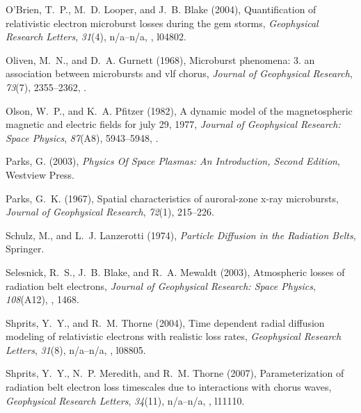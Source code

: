 \documentclass[draft,linenumbers]{agujournal}
\begin{document}
\begin{thebibliography}{35}
O'Brien, T.~P., M.~D. Looper, and J.~B. Blake (2004), Quantification of
  relativistic electron microburst losses during the gem storms,
  \textit{Geophysical Research Letters}, \textit{31}(4), n/a--n/a,
  , l04802.

Oliven, M.~N., and D.~A. Gurnett (1968), Microburst phenomena: 3. an
  association between microbursts and vlf chorus, \textit{Journal of
  Geophysical Research}, \textit{73}(7), 2355--2362,
  .

Olson, W.~P., and K.~A. Pfitzer (1982), A dynamic model of the magnetospheric
  magnetic and electric fields for july 29, 1977, \textit{Journal of
  Geophysical Research: Space Physics}, \textit{87}(A8), 5943--5948,
  .

Parks, G. (2003), \textit{Physics Of Space Plasmas: An Introduction, Second
  Edition}, Westview Press.

Parks, G.~K. (1967), Spatial characteristics of auroral-zone x-ray microbursts,
  \textit{Journal of Geophysical Research}, \textit{72}(1), 215--226.

Schulz, M., and L.~J. Lanzerotti (1974), \textit{Particle Diffusion in the
  Radiation Belts}, Springer.

Selesnick, R.~S., J.~B. Blake, and R.~A. Mewaldt (2003), Atmospheric losses of
  radiation belt electrons, \textit{Journal of Geophysical Research: Space
  Physics}, \textit{108}(A12), , 1468.

Shprits, Y.~Y., and R.~M. Thorne (2004), Time dependent radial diffusion
  modeling of relativistic electrons with realistic loss rates,
  \textit{Geophysical Research Letters}, \textit{31}(8), n/a--n/a,
  , l08805.

Shprits, Y.~Y., N.~P. Meredith, and R.~M. Thorne (2007), Parameterization of
  radiation belt electron loss timescales due to interactions with chorus
  waves, \textit{Geophysical Research Letters}, \textit{34}(11), n/a--n/a,
  , l11110.


\end{thebibliography}
\end{document}
